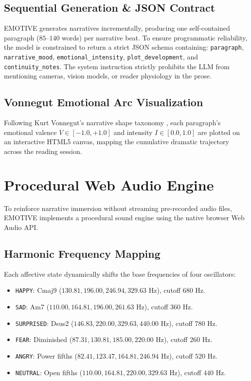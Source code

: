 \documentclass[sigconf,nonacm]{acmart}
\begin{document}
\subsection{Sequential Generation \& JSON Contract}

EMOTIVE generates narratives incrementally, producing one self-contained paragraph ($85\text{--}140$ words) per narrative beat. To ensure programmatic reliability, the model is constrained to return a strict JSON schema containing: \texttt{paragraph}, \texttt{narrative\_mood}, \texttt{emotional\_intensity}, \texttt{plot\_development}, and \texttt{continuity\_notes}. The system instruction strictly prohibits the LLM from mentioning cameras, vision models, or reader physiology in the prose.

\subsection{Vonnegut Emotional Arc Visualization}

Following Kurt Vonnegut's narrative shape taxonomy \cite{vonnegut1981shapes}, each paragraph's emotional valence $V \in [-1.0, +1.0]$ and intensity $I \in [0.0, 1.0]$ are plotted on an interactive HTML5 canvas, mapping the cumulative dramatic trajectory across the reading session.

\section{Procedural Web Audio Engine}

To reinforce narrative immersion without streaming pre-recorded audio files, EMOTIVE implements a procedural sound engine using the native browser Web Audio API.

\subsection{Harmonic Frequency Mapping}

Each affective state dynamically shifts the base frequencies of four oscillators:
\begin{itemize}
    \item \texttt{HAPPY}: Cmaj9 ($130.81, 196.00, 246.94, 329.63\text{ Hz}$), cutoff $680\text{ Hz}$.
    \item \texttt{SAD}: Am7 ($110.00, 164.81, 196.00, 261.63\text{ Hz}$), cutoff $360\text{ Hz}$.
    \item \texttt{SURPRISED}: Dsus2 ($146.83, 220.00, 329.63, 440.00\text{ Hz}$), cutoff $780\text{ Hz}$.
    \item \texttt{FEAR}: Diminished ($87.31, 130.81, 185.00, 220.00\text{ Hz}$), cutoff $260\text{ Hz}$.
    \item \texttt{ANGRY}: Power fifths ($82.41, 123.47, 164.81, 246.94\text{ Hz}$), cutoff $520\text{ Hz}$.
    \item \texttt{NEUTRAL}: Open fifths ($110.00, 164.81, 220.00, 329.63\text{ Hz}$), cutoff $440\text{ Hz}$.
\end{itemize}
\end{document}
